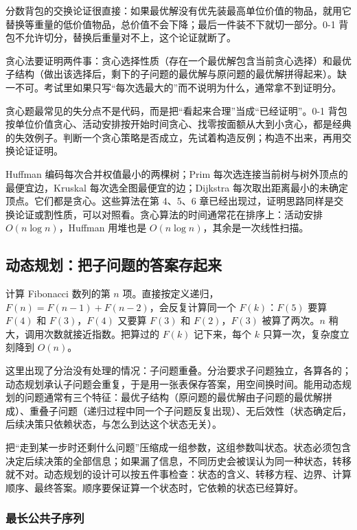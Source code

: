 分数背包的交换论证很直接：如果最优解没有优先装最高单位价值的物品，就用它替换等重量的低价值物品，总价值不会下降；最后一件装不下就切一部分。0-1 背包不允许切分，替换后重量对不上，这个论证就断了。

贪心法要证明两件事：贪心选择性质（存在一个最优解包含当前贪心选择）和最优子结构（做出该选择后，剩下的子问题的最优解与原问题的最优解拼得起来）。缺一不可。考试里如果只写“每次选最大的”而不说明为什么，通常拿不到证明分。

\begin{attention}
贪心题最常见的失分点不是代码，而是把“看起来合理”当成“已经证明”。0-1 背包按单位价值贪心、活动安排按开始时间贪心、找零按面额从大到小贪心，都是经典的失效例子。判断一个贪心策略是否成立，先试着构造反例；构造不出来，再用交换论证证明。
\end{attention}

Huffman 编码每次合并权值最小的两棵树；Prim 每次选连接当前树与树外顶点的最便宜边，Kruskal 每次选全图最便宜的边；\mbox{Dijkstra} 每次取出距离最小的未确定顶点。它们都是贪心。这些算法在第 4、5、6 章已经出现过，证明思路同样是交换论证或割性质，可以对照看。贪心算法的时间通常花在排序上：活动安排 $O(n\log n)$，Huffman 用堆也是 $O(n\log n)$，其余是一次线性扫描。

\subsection{动态规划：把子问题的答案存起来}

计算 Fibonacci 数列的第 $n$ 项。直接按定义递归，$F(n)=F(n-1)+F(n-2)$，会反复计算同一个 $F(k)$：$F(5)$ 要算 $F(4)$ 和 $F(3)$，$F(4)$ 又要算 $F(3)$ 和 $F(2)$，$F(3)$ 被算了两次。$n$ 稍大，调用次数就接近指数。把算过的 $F(k)$ 记下来，每个 $k$ 只算一次，复杂度立刻降到 $O(n)$。

这里出现了分治没有处理的情况：子问题重叠。分治要求子问题独立，各算各的；动态规划承认子问题会重复，于是用一张表保存答案，用空间换时间。能用动态规划的问题通常有三个特征：最优子结构（原问题的最优解由子问题的最优解拼成）、重叠子问题（递归过程中同一个子问题反复出现）、无后效性（状态确定后，后续决策只依赖状态，与怎么到达这个状态无关）。

把“走到某一步时还剩什么问题”压缩成一组参数，这组参数叫状态。状态必须包含决定后续决策的全部信息；如果漏了信息，不同历史会被误认为同一种状态，转移就不对。动态规划的设计可以按五件事检查：状态的含义、转移方程、边界、计算顺序、最终答案。顺序要保证算一个状态时，它依赖的状态已经算好。

\subsubsection{最长公共子序列}

